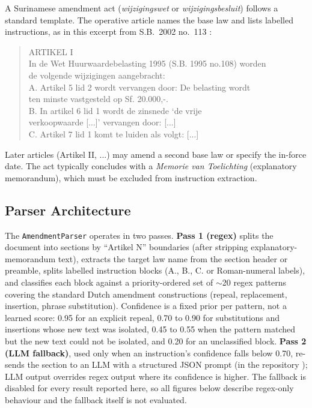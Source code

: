 \documentclass{IOS-Book-Article}
\begin{document}
A Surinamese amendment act (\emph{wijzigingswet} or \emph{wijzigingsbesluit}) follows a standard
template. The operative article names the base law and lists labelled instructions, as in
this excerpt from S.B.~2002 no.~113 \cite{sb2002113}:

\begin{quote}
\small\ttfamily
ARTIKEL I\\
In de Wet Huurwaardebelasting 1995 (S.B. 1995 no.108) worden\\
de volgende wijzigingen aangebracht:\\[4pt]
A. Artikel 5 lid 2 wordt vervangen door: De belasting wordt\\
\hspace*{3ex}ten minste vastgesteld op Sf. 20.000,-.\\
B. In artikel 6 lid 1 wordt de zinsnede `de vrije\\
\hspace*{3ex}verkoopwaarde [...]' vervangen door: [...]\\
C. Artikel 7 lid 1 komt te luiden als volgt: [...]
\end{quote}

Later articles (Artikel II, ...) may amend a second base law or
specify the in-force date. The act typically concludes with a \emph{Memorie van Toelichting}
(explanatory memorandum), which must be excluded from instruction extraction.

\subsection{Parser Architecture}

The \texttt{AmendmentParser} operates in two passes. \textbf{Pass 1 (regex)} splits the document into
sections by ``Artikel N'' boundaries (after stripping explanatory-memorandum text), extracts
the target law name from the section header or preamble, splits labelled instruction blocks
(A., B., C. or Roman-numeral labels), and classifies each block against a priority-ordered
set of $\sim$20 regex patterns covering the standard Dutch amendment constructions (repeal,
replacement, insertion, phrase substitution). Confidence is a fixed prior per pattern, not a
learned score: 0.95 for an explicit repeal, 0.70 to 0.90 for substitutions and insertions
whose new text was isolated, 0.45 to 0.55 when the pattern matched but the new text could
not be isolated, and 0.20 for an unclassified block. \textbf{Pass 2 (LLM fallback)}, used
only when an instruction's confidence falls below 0.70, re-sends the section to an LLM
with a structured JSON prompt (in the repository \cite{repo}); LLM output overrides regex output where its confidence is
higher. The fallback is disabled for every result reported here, so all figures below
describe regex-only behaviour and the fallback itself is not evaluated.
\end{document}

